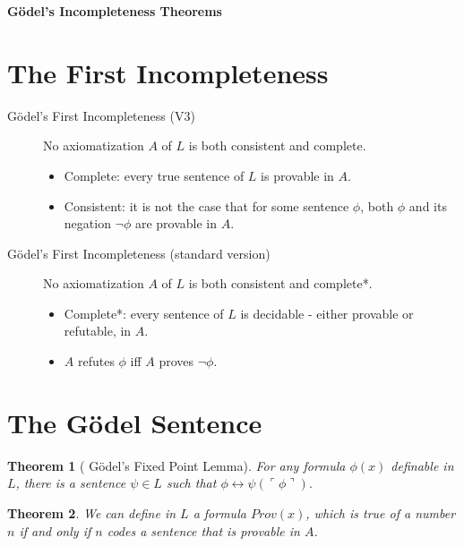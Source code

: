 \documentclass[12pt]{article}
\newtheorem{theo}{Theorem}[section]
\theoremstyle{definition}
\begin{document}


\begin{center}
{\Large \bf G\"{o}del's Incompleteness Theorems}
\end{center}

\smallskip

\section{The First Incompleteness}

\begin{description}
\item[G\"{o}del's First Incompleteness (V3)] No axiomatization $A$ of $L$ is both consistent and complete.
\begin{itemize}
\item Complete: every true sentence of $L$ is provable in $A$.
\item Consistent: it is not the case that for some sentence $\phi$, both $\phi$ and its negation $\neg \phi$ are provable in $A$.
\end{itemize}
\end{description}

\noindent
\begin{description}
\item[G\"{o}del's First Incompleteness (standard version)] No axiomatization $A$ of $L$ is both consistent and complete*.
\begin{itemize}
\item Complete*: every sentence of $L$ is decidable - either provable or refutable, in $A$.
\item $A$ refutes $\phi$ iff $A$ proves $\neg \phi$.
\end{itemize}
\end{description}

\section{The G\"{o}del Sentence}

\begin{theo} [ G\"odel's Fixed Point Lemma]
For any formula $\phi(x)$ definable in $L$, there is a sentence $\psi \in L$ such that $\phi \leftrightarrow \psi (\ulcorner \phi \urcorner).$
\end{theo}

\begin{theo}
We can define in $L$ a formula $Prov(x)$, which is true of a number $n$ if and only if $n$ codes a sentence that is provable in $A$.
\end{theo}
\end{document}
